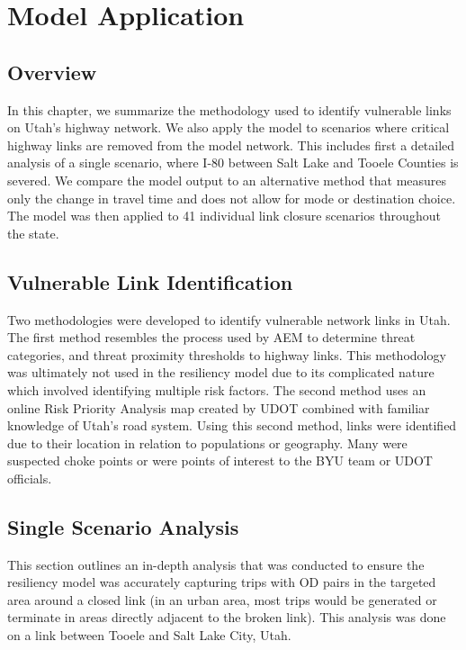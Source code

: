 \chapter{Model Application}
\label{chp:chapter4}
\graphicspath{{figures/}{figures/chapter4/}}

\section{Overview}
In this chapter, we summarize the methodology used to identify vulnerable
links on Utah’s highway network. We also apply the model to scenarios
where critical highway links are removed from the model network. This
includes first a detailed analysis of a single scenario, where I-80
between Salt Lake and Tooele Counties is severed. We compare the model
output to an alternative method that measures only the change in travel
time and does not allow for mode or destination choice. The model was then
applied to 41 individual link closure scenarios throughout the state.

\section{Vulnerable Link Identification}

Two methodologies were developed to identify vulnerable network links in
Utah. The first method resembles the process used by AEM to determine
threat categories, and threat proximity thresholds to highway links. This
methodology was ultimately not used in the resiliency model due to its
complicated nature which involved identifying multiple risk factors. The
second method uses an online Risk Priority Analysis map created by UDOT
combined with familiar knowledge of Utah’s road system. Using this second
method, links were identified due to their location in relation to
populations or geography. Many were suspected choke points or were points
of interest to the BYU team or UDOT officials.

\section{Single Scenario Analysis}

This section outlines an in-depth analysis that was conducted to ensure
the resiliency model was accurately capturing trips with OD pairs in the
targeted area around a closed link (in an urban area, most trips would be
generated or terminate in areas directly adjacent to the broken link).
This analysis was done on a link between Tooele and Salt Lake City, Utah.

